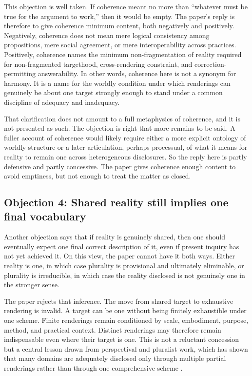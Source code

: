 \documentclass[11pt]{article}
\begin{document}
This objection is well taken. If coherence meant no more than ``whatever must be true for the argument to work,'' then it would be empty. The paper's reply is therefore to give coherence minimum content, both negatively and positively. Negatively, coherence does not mean mere logical consistency among propositions, mere social agreement, or mere interoperability across practices. Positively, coherence names the minimum non-fragmentation of reality required for non-fragmented targethood, cross-rendering constraint, and correction-permitting answerability. In other words, coherence here is not a synonym for harmony. It is a name for the worldly condition under which renderings can genuinely be about one target strongly enough to stand under a common discipline of adequacy and inadequacy.

That clarification does not amount to a full metaphysics of coherence, and it is not presented as such. The objection is right that more remains to be said. A fuller account of coherence would likely require either a more explicit ontology of worldly structure or a later articulation, perhaps processual, of what it means for reality to remain one across heterogeneous disclosures. So the reply here is partly defensive and partly concessive. The paper gives coherence enough content to avoid emptiness, but not enough to treat the matter as closed.

\subsection{Objection 4: Shared reality still implies one final vocabulary}

Another objection says that if reality is genuinely shared, then one should eventually expect one final correct description of it, even if present inquiry has not yet achieved it. On this view, the paper cannot have it both ways. Either reality is one, in which case plurality is provisional and ultimately eliminable, or plurality is irreducible, in which case the reality disclosed is not genuinely one in the stronger sense.

The paper rejects that inference. The move from shared target to exhaustive rendering is invalid. A target can be one without being finitely exhaustible under one scheme. Finite renderings remain conditioned by scale, embodiment, purpose, method, and practical context. Distinct renderings may therefore remain indispensable even where their target is one. This is not a reluctant concession but a central lesson drawn from perspectival and pluralist work, which has shown that many domains are adequately disclosed only through multiple partial renderings rather than through one comprehensive scheme \cite{Massimi2022PerspectivalRealism,Chang2022RealismForRealisticPeople}.
\end{document}
